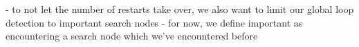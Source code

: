 - to not let the number of restarts take over, we also want to limit our global loop detection to important search nodes
- for now, we define important as encountering a search node which we've encountered before

\begin{comment}
Quotient filter:
- do we need the original elements to re-insert them?
- do we need to communicate whole hashes to combine filters? (worse communication size!)


Advantages:
- communication takes less effort (a lot lower size of data!)
- hashing in O(1)? Or at least in a lot easier
- we can pre-hash the open tasks (can be of exponential depth (requires a good argument, as the path down the task network could be of width 1?) \todo{do the maths}), thus turning hashing into O(1)
- in case of hash collisions we need to walk the whole sequence of open tasks
- in practice this is even worse, as our open tasks are saved in a tree-like manner to allow sharing of the tasks between search nodes
- this means we wildly jump through memory for hashing, adding another constant factor
- we could save on this constant factor by duplicating the open tasks for each node and saving them sequentially, but leading to a lot higher memory footprint (might be quadratic compared to what it is already (if any fixed fraction of nodes have at least 2 children, maybe? \todo{some math}))
- compromise between performance and false-positive rate (better for correctness than just comparing a single hash)
\end{comment}
